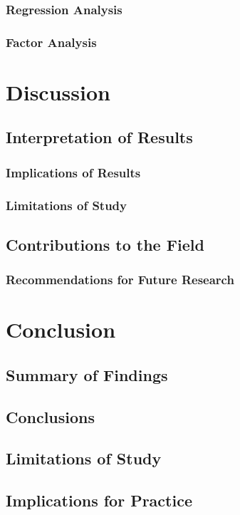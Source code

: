 \documentclass[
    writingLanguage=english, 
    addPageTitle=on,
    addDeclaration=on,
    addMUSTlog=off,
    printing=off,
    refIndent=on,
    addFigTOC=on,
    addTabTOC=on,
]{.def/must}
\begin{document}
\subsection{Regression Analysis}
\subsection{Factor Analysis}

\chapter{Discussion}
\section{Interpretation of Results}
\subsection{Implications of Results}
\subsection{Limitations of Study}
\section{Contributions to the Field}
\subsection{Recommendations for Future Research}
\chapter{Conclusion}
\section{Summary of Findings}
\section{Conclusions}
\section{Limitations of Study}
\section{Implications for Practice}
\end{document}
